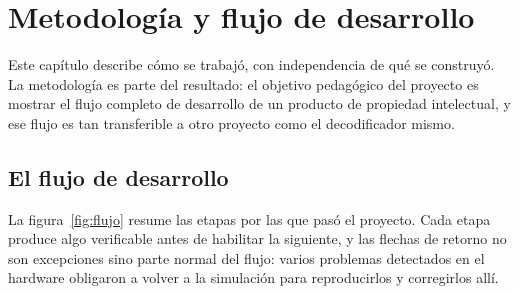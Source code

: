 \chapter{Metodología y flujo de desarrollo}
\label{cap:metodologia}

Este capítulo describe cómo se trabajó, con independencia de qué se
construyó. La metodología es parte del resultado: el objetivo pedagógico del
proyecto es mostrar el flujo completo de desarrollo de un producto de
propiedad intelectual, y ese flujo es tan transferible a otro proyecto como
el decodificador mismo.

\section{El flujo de desarrollo}
\label{sec:flujo}

La figura~\ref{fig:flujo} resume las etapas por las que pasó el proyecto.
Cada etapa produce algo verificable antes de habilitar la siguiente, y las
flechas de retorno no son excepciones sino parte normal del flujo: varios
problemas detectados en el hardware obligaron a volver a la simulación para
reproducirlos y corregirlos allí.

